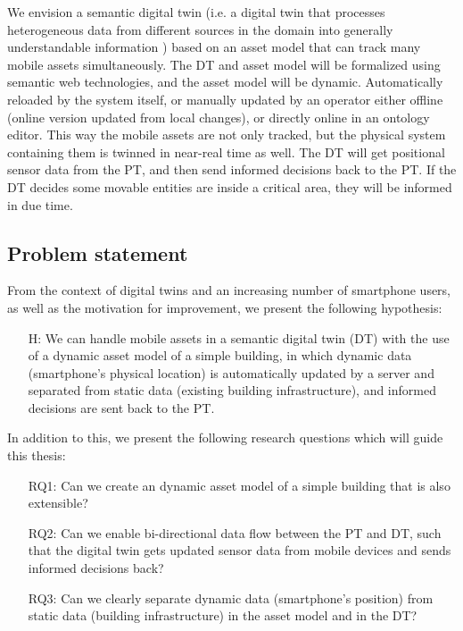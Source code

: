 \documentclass{article}
\begin{document}
We envision a semantic digital twin (i.e. a digital twin that processes heterogeneous data from different sources in the domain into generally understandable information \cite{birgit_boss_digital_nodate}) based on an asset model that can track many mobile assets simultaneously. The DT and asset model will be formalized using semantic web technologies, and the asset model will be dynamic. Automatically reloaded by the system itself, or manually updated by an operator either offline (online version updated from local changes), or directly online in an ontology editor. This way the mobile assets are not only tracked, but the physical system containing them is twinned in near-real time as well. The DT will get positional sensor data from the PT, and then send informed decisions back to the PT. If the DT decides some movable entities are inside a critical area, they will be informed in due time.

\subsection{Problem statement}
From the context of digital twins and an increasing number of smartphone users, as well as the motivation for improvement, we present the following hypothesis:

\begin{itemize}
    \item[H:] We can handle mobile assets in a semantic digital twin (DT) with the use of a dynamic asset model of a simple building, in which dynamic data (smartphone's physical location) is automatically updated by a server and separated from static data (existing building infrastructure), and informed decisions are sent back to the PT.
\end{itemize}


In addition to this, we present the following research questions which will guide this thesis:
\begin{itemize}
    \item[RQ1:] Can we create an dynamic asset model of a simple building that is also extensible?
    \item [RQ2:] Can we enable bi-directional data flow between the PT and DT, such that the digital twin gets updated sensor data from mobile devices and sends informed decisions back?
    \item [RQ3:] Can we clearly separate dynamic data (smartphone's position) from static data (building infrastructure) in the asset model and in the DT?
\end{itemize}
\end{document}
